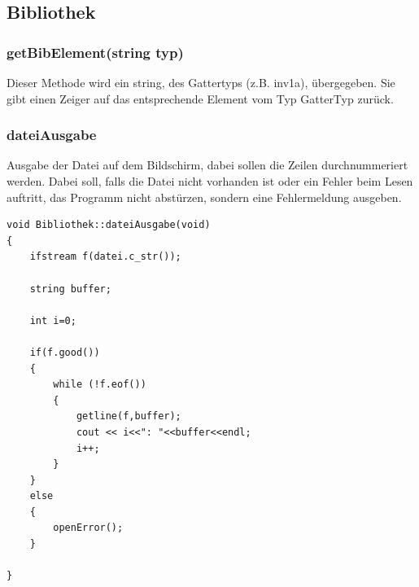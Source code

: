 \documentclass[a4paper,10pt,twoside]{report}
\begin{document}
\subsection{Bibliothek}
\subsubsection{getBibElement(string typ)}
Dieser Methode wird ein string, des Gattertyps (z.B. inv1a), übergegeben.
Sie gibt einen Zeiger auf das entsprechende Element vom Typ GatterTyp zurück.

\subsubsection{dateiAusgabe}
Ausgabe der Datei auf dem Bildschirm, dabei sollen die Zeilen durchnummeriert werden.
Dabei soll, falls die Datei nicht vorhanden ist oder ein Fehler beim Lesen auftritt,
das Programm nicht abstürzen, sondern eine Fehlermeldung ausgeben.

\begin{lstlisting}
void Bibliothek::dateiAusgabe(void)
{
    ifstream f(datei.c_str());

    string buffer;

    int i=0;

    if(f.good())
    {
        while (!f.eof())
        {
            getline(f,buffer);
            cout << i<<": "<<buffer<<endl;
            i++;
        }
    }
    else
    {
        openError();
    }

}
\end{lstlisting}
\end{document}
